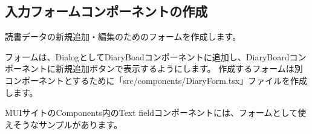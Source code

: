 \subsection{入力フォームコンポーネントの作成}
\keeplastskip{
  \label{sec:3-3-7}
  \label{sec-0337}
  \par\nobreak
}

読書データの新規追加・編集のためのフォームを作成します。

\vspace*{\baselineskip}

フォームは、DialogとしてDiaryBoadコンポーネントに追加し、DiaryBoardコンポーネントに新規追加ボタンで表示するようにします。
作成するフォームは別コンポーネントとするために「src/components/DiaryForm.tsx」ファイルを作成します。

\vspace*{\baselineskip}

MUIサイトのComponents内のText fieldコンポーネントには、フォームとして使えそうなサンプルがあります。


